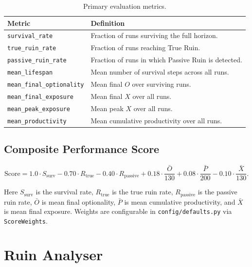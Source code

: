 \begin{table}[ht]
\centering
\small
\begin{tabularx}{\linewidth}{lX}
\toprule
\textbf{Metric} & \textbf{Definition} \\
\midrule
\texttt{survival\_rate}
& Fraction of runs surviving the full horizon. \\
\texttt{true\_ruin\_rate}
& Fraction of runs reaching True Ruin. \\
\texttt{passive\_ruin\_rate}
& Fraction of runs in which Passive Ruin is detected. \\
\texttt{mean\_lifespan}
& Mean number of survival steps across all runs. \\
\texttt{mean\_final\_optionality}
& Mean final $O$ over surviving runs. \\
\texttt{mean\_final\_exposure}
& Mean final $X$ over all runs. \\
\texttt{mean\_peak\_exposure}
& Mean peak $X$ over all runs. \\
\texttt{mean\_productivity}
& Mean cumulative productivity over all runs. \\
\bottomrule
\end{tabularx}
\caption[Primary metrics]{Primary evaluation metrics.}
\label{tab:vnext-primary-metrics}
\end{table}

\subsection{Composite Performance Score}
\label{sec:vnext-composite-score}

\begin{equation}
\mathrm{Score} = 1.0 \cdot S_{\mathrm{surv}}
- 0.70 \cdot R_{\mathrm{true}}
- 0.40 \cdot R_{\mathrm{passive}}
+ 0.18 \cdot \frac{\bar{O}}{130}
+ 0.08 \cdot \frac{\bar{P}}{200}
- 0.10 \cdot \frac{\bar{X}}{130}.
\label{eq:vnext-composite-score}
\end{equation}

Here $S_{\mathrm{surv}}$ is the survival rate,
$R_{\mathrm{true}}$ is the true ruin rate,
$R_{\mathrm{passive}}$ is the passive ruin rate, $\bar{O}$ is mean
final optionality, $\bar{P}$ is mean cumulative productivity, and
$\bar{X}$ is mean final exposure. Weights are configurable in
\texttt{config/defaults.py} via \texttt{ScoreWeights}.

\section{Ruin Analyser}
\label{sec:vnext-ruin-analyser}


